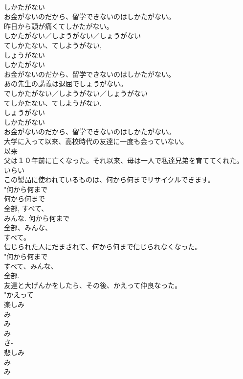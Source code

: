 \documentclass[8pt]{extreport}
\begin{document}
\begin{CJK}{UTF8}{min}
{\\	しかたがない 
\\	お金がないのだから、留学できないのはしかたがない。
\\	昨日から頭が痛くてしかたがない。	
\\	しかたがない／しようがない／しょうがない 
\\	てしかたない、てしようがない,
\\	しょうがない　
\\	しかたがない 
\\	お金がないのだから、留学できないのはしかたがない。
\\	あの先生の講義は退屈でしょうがない。	
\\	でしかたがない／しようがない／しょうがない 
\\	てしかたない、てしようがない,
\\	しょうがない　
\\	しかたがない 
\\	お金がないのだから、留学できないのはしかたがない。
\\	大学に入って以来、高校時代の友達に一度も会っていない。	
\\	以来 
\\	父は１０年前に亡くなった。それ以来、母は一人で私達兄弟を育ててくれた。	
\\	いらい 
\\	この製品に使われているものは、何から何までリサイクルできます。	
\\	"何から何まで 
\\	何から何まで 
\\	全部, すべて、
\\	みんな. 何から何まで 
\\	全部、みんな、
\\	すべて。
\\	信じられた人にだまされて、何から何まで信じられなくなった。	
\\	"何から何まで 
\\	すべて、みんな、
\\	全部.
\\	友達と大げんかをしたら、その後、かえって仲良なった。	
\\	"かえって 
\\	楽しみ	
\\	み 
\\	み 
\\	み 
\\	さ-
\\	悲しみ	
\\	み 
\\	み 
}
\end{CJK}
\end{document}
